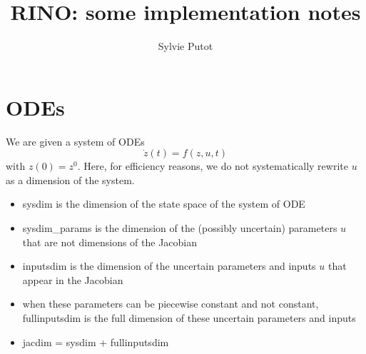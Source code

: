 \documentclass{llncs}
\begin{document}
\title{RINO: some implementation notes}

\author{Sylvie Putot}


\maketitle

\section{ODEs}
We are given a system of ODEs
\[ \dot z(t) = f(z,u,t) \]
with $z(0)=z^0$.
Here, for efficiency reasons, we do not systematically rewrite $u$ as a dimension of the system.

\begin{itemize}
\item sysdim is the dimension of the state space of the system of ODE
\item sysdim\_params is the dimension of the (possibly uncertain) parameters $u$ that are not dimensions of the Jacobian
\item inputsdim is the dimension of the uncertain parameters and inputs $u$ that appear in the Jacobian
\item when these parameters can be piecewise constant and not constant, fullinputsdim is the full dimension of these uncertain parameters and inputs
\item jacdim = sysdim + fullinputsdim
\end{itemize}
\end{document}
